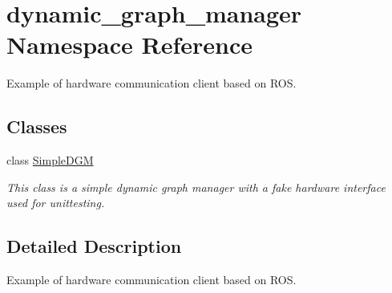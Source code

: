 \hypertarget{namespacedynamic__graph__manager}{}\section{dynamic\+\_\+graph\+\_\+manager Namespace Reference}
\label{namespacedynamic__graph__manager}


Example of hardware communication client based on R\+OS.  


\subsection*{Classes}
\begin{DoxyCompactItemize}
\item 
class \hyperlink{classdynamic__graph__manager_1_1SimpleDGM}{Simple\+D\+GM}
\begin{DoxyCompactList}\small\item\em This class is a simple dynamic graph manager with a fake hardware interface used for unittesting. \end{DoxyCompactList}\end{DoxyCompactItemize}


\subsection{Detailed Description}
Example of hardware communication client based on R\+OS. 